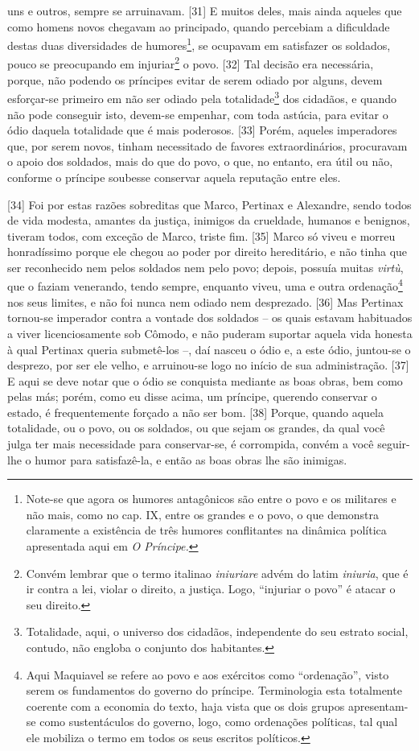 uns e outros, sempre se arruinavam. {[}31{]} E muitos deles, mais ainda
aqueles que como homens novos chegavam ao principado, quando percebiam a
dificuldade destas duas diversidades de humores\footnote{Note-se que
  agora os humores antagônicos são entre o povo e os militares e não
  mais, como no cap. IX, entre os grandes e o povo, o que demonstra
  claramente a existência de três humores conflitantes na dinâmica
  política apresentada aqui em \emph{O Príncipe.}}, se ocupavam em
satisfazer os soldados, pouco se preocupando em injuriar\footnote{Convém
  lembrar que o termo italinao \emph{iniuriare} advém do latim
  \emph{iniuria}, que é ir contra a lei, violar o direito, a justiça.
  Logo, ``injuriar o povo'' é atacar o seu direito.} o povo. {[}32{]}
Tal decisão era necessária, porque, não podendo os príncipes evitar de
serem odiado por alguns, devem esforçar-se primeiro em não ser odiado
pela totalidade\footnote{Totalidade, aqui, o universo dos cidadãos,
  independente do seu estrato social, contudo, não engloba o conjunto
  dos habitantes.} dos cidadãos, e quando não pode conseguir isto,
devem-se empenhar, com toda astúcia, para evitar o ódio daquela
totalidade que é mais poderosos. {[}33{]} Porém, aqueles imperadores
que, por serem novos, tinham necessitado de favores extraordinários,
procuravam o apoio dos soldados, mais do que do povo, o que, no entanto,
era útil ou não, conforme o príncipe soubesse conservar aquela reputação
entre eles.

{[}34{]} Foi por estas razões sobreditas que Marco, Pertinax e
Alexandre, sendo todos de vida modesta, amantes da justiça, inimigos da
crueldade, humanos e benignos, tiveram todos, com exceção de Marco,
triste fim. {[}35{]} Marco só viveu e morreu honradíssimo porque ele
chegou ao poder por direito hereditário, e não tinha que ser reconhecido
nem pelos soldados nem pelo povo; depois, possuía muitas \emph{virtù},
que o faziam venerando, tendo sempre, enquanto viveu, uma e outra
ordenação\footnote{Aqui Maquiavel se refere ao povo e aos exércitos como
  ``ordenação'', visto serem os fundamentos do governo do príncipe.
  Terminologia esta totalmente coerente com a economia do texto, haja
  vista que os dois grupos apresentam-se como sustentáculos do governo,
  logo, como ordenações políticas, tal qual ele mobiliza o termo em
  todos os seus escritos políticos.} nos seus limites, e não foi nunca
nem odiado nem desprezado. {[}36{]} Mas Pertinax tornou-se imperador
contra a vontade dos soldados -- os quais estavam habituados a viver
licenciosamente sob Cômodo, e não puderam suportar aquela vida honesta à
qual Pertinax queria submetê-los --, daí nasceu o ódio e, a este ódio,
juntou-se o desprezo, por ser ele velho, e arruinou-se logo no início de
sua administração. {[}37{]} E aqui se deve notar que o ódio se conquista
mediante as boas obras, bem como pelas más; porém, como eu disse acima,
um príncipe, querendo conservar o estado, é frequentemente forçado a não
ser bom. {[}38{]} Porque, quando aquela totalidade, ou o povo, ou os
soldados, ou que sejam os grandes, da qual você julga ter mais
necessidade para conservar-se, é corrompida, convém a você seguir-lhe o
humor para satisfazê-la, e então as boas obras lhe são inimigas.

